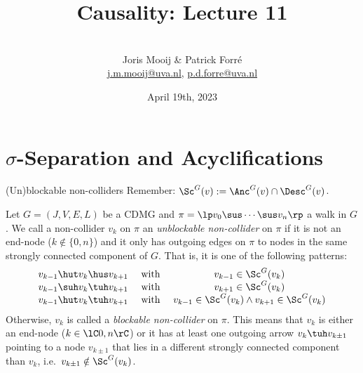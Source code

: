 \title[Causality]{Causality: Lecture 11}
\author[Joris Mooij]{\\[5mm]\large Joris Mooij \& Patrick Forr\'e\\
\url{j.m.mooij@uva.nl}, \url{p.d.forre@uva.nl}}
\date[2022-04-19]{\normalsize April 19th, 2023}
\maketitle

\part{$\sigma$-Separation and Acyclifications}
\frame{\partpage}

\begin{frame}{(Un)blockable non-colliders}
Remember: $\Sc^G(v) := \Anc^G(v) \cap \Desc^G(v)$.
\begin{Def}[\ref{def:unblockable_noncollider}]
  Let $G=(J,V,E,L)$ be a CDMG and $ \pi =\lp  v_0 \sus \cdots \sus v_n \rp $ a walk in $G$.
  We call a non-collider $v_k$ on $\pi$ an \emph{unblockable non-collider} on $\pi$ if it is not an end-node ($k \notin \{0,n\}$) and it only has outgoing edges on $\pi$ to nodes in the same strongly connected component of $G$. That is,
  it is one of the following patterns:
  \[\begin{array}{rccl}
    v_{k-1} \hut v_k \hus v_{k+1} & \text{ with } & v_{k-1} \in \Sc^G(v_{k})\\
    v_{k-1} \suh v_k \tuh v_{k+1} & \text{ with } & v_{k+1} \in \Sc^G(v_{k})\\
    v_{k-1} \hut v_k \tuh v_{k+1} & \text{ with } & v_{k-1} \in \Sc^G(v_k) \land v_{k+1} \in \Sc^G(v_k)
  \end{array}\]
  Otherwise, $v_k$ is called a \emph{blockable non-collider} on $\pi$.
  This means that $v_k$ is either an end-node ($k \in \lC 0,n\rC$) or it has at least one outgoing arrow 
  $v_k \tuh v_{k\pm1}$ pointing to a node $v_{k\pm1}$ that lies in a different strongly connected component than $v_k$, i.e.\ $v_{k\pm1} \notin \Sc^G(v_k)$.
\end{Def}
\end{frame}

